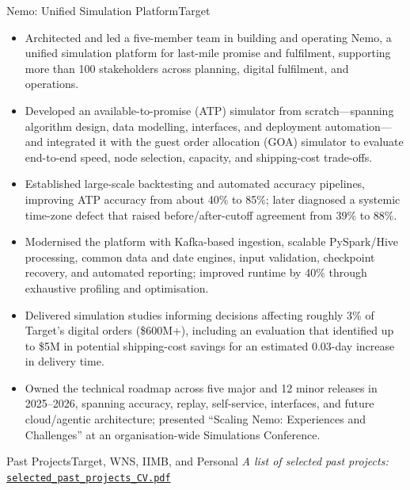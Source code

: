 \documentclass[11pt,a4paper]{moderncv}
\begin{document}
    {Nemo: Unified Simulation Platform}{Target}{}{}{
    \begin{itemize}
        \item Architected and led a five-member team in building and operating Nemo, a unified simulation platform for last-mile promise and fulfilment, supporting more than 100 stakeholders across planning, digital fulfilment, and operations.
        \item Developed an available-to-promise (ATP) simulator from scratch---spanning algorithm design, data modelling, interfaces, and deployment automation---and integrated it with the guest order allocation (GOA) simulator to evaluate end-to-end speed, node selection, capacity, and shipping-cost trade-offs.
        \item Established large-scale backtesting and automated accuracy pipelines, improving ATP accuracy from about 40\% to 85\%; later diagnosed a systemic time-zone defect that raised before/after-cutoff agreement from 39\% to 88\%.
        \item Modernised the platform with Kafka-based ingestion, scalable PySpark/Hive processing, common data and date engines, input validation, checkpoint recovery, and automated reporting; improved runtime by 40\% through exhaustive profiling and optimisation.
        \item Delivered simulation studies informing decisions affecting roughly 3\% of Target's digital orders (\$600M+), including an evaluation that identified up to \$5M in potential shipping-cost savings for an estimated 0.03-day increase in delivery time.
        \item Owned the technical roadmap across five major and 12 minor releases in 2025--2026, spanning accuracy, replay, self-service, interfaces, and future cloud/agentic architecture; presented ``Scaling Nemo: Experiences and Challenges'' at an organisation-wide Simulations Conference.
    \end{itemize}
    }

    {Past Projects}{Target, WNS, IIMB, and Personal}{}{}{
    \noindent \textit{A list of selected past projects:}
    \href{https://github.com/nik141088/CV/blob/main/selected_past_projects_CV.pdf}{\texttt{selected\_past\_projects\_CV.pdf}}
    }

\end{document}
